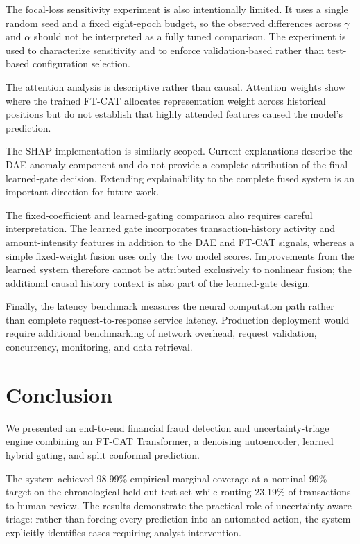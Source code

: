 \documentclass[conference]{IEEEtran}
\begin{document}
The focal-loss sensitivity experiment is also intentionally limited. It uses a
single random seed and a fixed eight-epoch budget, so the observed differences
across $\gamma$ and $\alpha$ should not be interpreted as a fully tuned
comparison. The experiment is used to characterize sensitivity and to enforce
validation-based rather than test-based configuration selection.

The attention analysis is descriptive rather than causal. Attention weights
show where the trained FT-CAT allocates representation weight across historical
positions but do not establish that highly attended features caused the model's
prediction.

The SHAP implementation is similarly scoped. Current explanations describe the
DAE anomaly component and do not provide a complete attribution of the final
learned-gate decision. Extending explainability to the complete fused system is
an important direction for future work.

The fixed-coefficient and learned-gating comparison also requires careful
interpretation. The learned gate incorporates transaction-history activity and
amount-intensity features in addition to the DAE and FT-CAT signals, whereas a
simple fixed-weight fusion uses only the two model scores. Improvements from the
learned system therefore cannot be attributed exclusively to nonlinear fusion;
the additional causal history context is also part of the learned-gate design.

Finally, the latency benchmark measures the neural computation path rather than
complete request-to-response service latency. Production deployment would
require additional benchmarking of network overhead, request validation,
concurrency, monitoring, and data retrieval.

\section{Conclusion}
\label{sec:conclusion}

We presented an end-to-end financial fraud detection and uncertainty-triage
engine combining an FT-CAT Transformer, a denoising autoencoder, learned hybrid
gating, and split conformal prediction.

The system achieved 98.99\% empirical marginal coverage at a nominal 99\% target
on the chronological held-out test set while routing 23.19\% of transactions to
human review. The results demonstrate the practical role of uncertainty-aware
triage: rather than forcing every prediction into an automated action, the
system explicitly identifies cases requiring analyst intervention.
\end{document}
